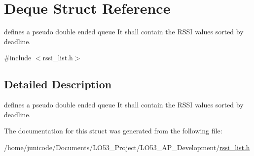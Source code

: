\hypertarget{struct_deque}{}\section{Deque Struct Reference}
\label{struct_deque}


defines a pseudo double ended queue It shall contain the R\+S\+S\+I values sorted by deadline.  




{\ttfamily \#include $<$rssi\+\_\+list.\+h$>$}



\subsection{Detailed Description}
defines a pseudo double ended queue It shall contain the R\+S\+S\+I values sorted by deadline. 

The documentation for this struct was generated from the following file\+:\begin{DoxyCompactItemize}
\item 
/home/junicode/\+Documents/\+L\+O53\+\_\+\+Project/\+L\+O53\+\_\+\+A\+P\+\_\+\+Development/\hyperlink{rssi__list_8h}{rssi\+\_\+list.\+h}\end{DoxyCompactItemize}
